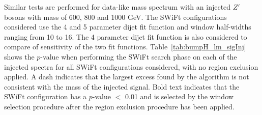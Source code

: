 \FloatBarrier

Similar tests are performed for data-like mass spectrum
with an injected $Z'$ bosons with mass of 600, 800 and 1000 GeV.
The SWiFt configurations considered use the 4 and 5 parameter dijet fit function and window half-widths ranging from 10 to 16.
The 4 parameter dijet fit function is also considered to compare of sensitivity of the two fit functions.
Table~\ref{tab:bumpH_lm_sigInj} shows the \bh{} \mbox{$p$-value} 
when performing the SWiFt search phase on each of the injected spectra
for all SWiFt configurations considered, with no region exclusion applied.
A dash indicates that the largest excess found by the \bh{} algorithm is not consistent with the mass of the injected signal.
Bold text indicates that the SWiFt configuration has a \bh{} $p$-value $<$ 0.01
and is selected by the window selection procedure after the region exclusion procedure has been applied.


